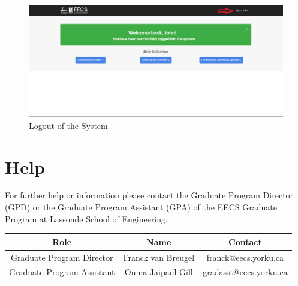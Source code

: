 \documentclass[fontsize=12pt,paper=letter,twoside]{scrartcl}
\begin{document}
\begin{figure}[!htb]
\begin{center}
\includegraphics[width=.99\textwidth]{images/logout.png}
\end{center}
\caption{Logout of the System}
\label{fig:logout}
\end{figure}

\newpage
\section{Help}
For further help or information please contact the Graduate Program Director (GPD) or the Graduate Program Assistant (GPA) of the EECS Graduate Program at Lassonde School of Engineering.\\

\begin{center}
\begin{tabular}{ |c |c |c | } \hline
 \textbf{Role} & \textbf{Name} & \textbf{Contact} \\ \hline
 Graduate Program Director & Franck van Breugel & franck@eecs.yorku.ca \\ \hline
 Graduate Program Assistant & Ouma Jaipaul-Gill & gradasst@eecs.yorku.ca \\ \hline
\end{tabular}
\end{center}
\end{document}
